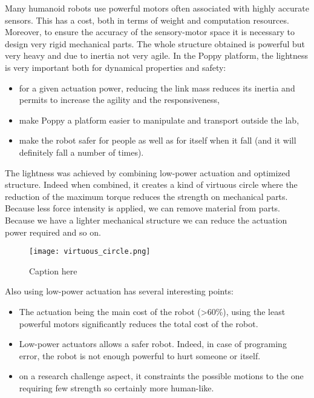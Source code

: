 Many humanoid robots use powerful motors often associated with highly accurate sensors. This has a cost, both in terms of weight and computation resources. Moreover, to ensure the accuracy of the sensory-motor space it is necessary to design very rigid mechanical parts. The whole structure obtained is powerful but very heavy and due to inertia not very agile.
In the Poppy platform, the lightness is very important both for dynamical properties and safety:
\begin{itemize}
    \item for a given actuation power, reducing the link mass reduces its inertia and permits to increase the agility and the responsiveness,
    \item make Poppy a platform easier to manipulate and transport outside the lab,
    \item make the robot safer for people as well as for itself when it fall (and it will definitely fall a number of times).
\end{itemize}

The lightness was achieved by combining low-power actuation and optimized structure. Indeed when combined, it creates a kind of virtuous circle where the reduction of the maximum torque reduces the strength on mechanical parts. Because less force intensity is applied, we can remove material from parts. Because we have a lighter mechanical structure we can reduce the actuation power required and so on.

\begin{figure}[tb]
    \begin{center}
        \texttt{[image: virtuous\_circle.png]}
    \end{center}
    \caption{Caption here}
    \label{fig:figure1}
\end{figure}

Also using low-power actuation has several interesting points:

\begin{itemize}
    \item The actuation being the main cost of the robot (>60\%), using the least powerful motors significantly reduces the total cost of the robot.
    \item Low-power actuators allows a safer robot. Indeed, in case of programing error, the robot is not enough powerful to hurt someone or itself.
    \item on a research challenge aspect, it constraints the possible motions to the one requiring few strength so certainly more human-like.
\end{itemize}


